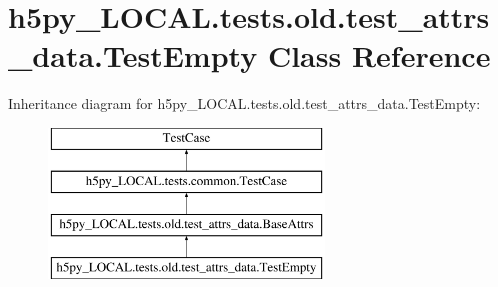 \hypertarget{classh5py__LOCAL_1_1tests_1_1old_1_1test__attrs__data_1_1TestEmpty}{}\section{h5py\+\_\+\+L\+O\+C\+A\+L.\+tests.\+old.\+test\+\_\+attrs\+\_\+data.\+Test\+Empty Class Reference}
\label{classh5py__LOCAL_1_1tests_1_1old_1_1test__attrs__data_1_1TestEmpty}
Inheritance diagram for h5py\+\_\+\+L\+O\+C\+A\+L.\+tests.\+old.\+test\+\_\+attrs\+\_\+data.\+Test\+Empty\+:\begin{figure}[H]
\begin{center}
\leavevmode
\includegraphics[height=4.000000cm]{classh5py__LOCAL_1_1tests_1_1old_1_1test__attrs__data_1_1TestEmpty}
\end{center}
\end{figure}
